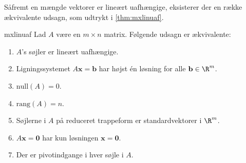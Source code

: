 %
%
%
Såfremt en mængde vektorer er lineært uafhængige, eksisterer der en række ækvivalente udsagn, som udtrykt i \ref{thm:mxlinuaf}.
%
%
\begin{thm}{}{mxlinuaf}
%
Lad $A$ være en $m \times n$ matrix.
Følgende udsagn er ækvivalente:
%
\begin{enumerate}[label=(\alph*)]
\item $A$'s søjler er lineært uafhængige. 
\item Ligningssystemet $A\mathbf{x}=\mathbf{b}$ har højst én løsning for alle $\mathbf{b} \in \R^m$.
\item $\text{null}(A)=0$.
\item $\text{rang}(A)=n$.
\item Søjlerne i $A$ på reduceret trappeform er standardvektorer i $\R^m$.
\item $A\mathbf{x}=\mathbf{0}$ har kun løsningen $\mathbf{x}=\mathbf{0}$.                                                                                                                                                                                                                                                                                                                         
\item Der er pivotindgange i hver søjle i $A$. 
\end{enumerate}
%
\end{thm}
%
%
